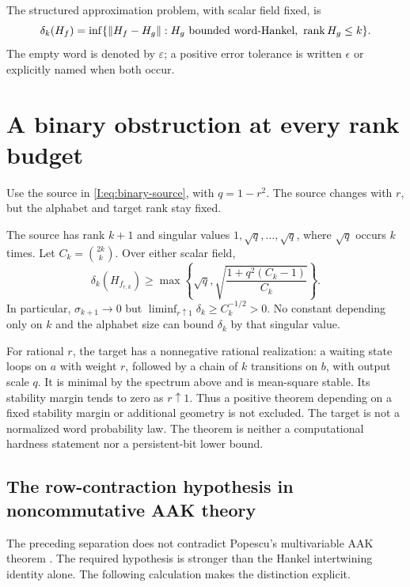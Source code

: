 The structured approximation problem, with scalar field fixed, is
\begin{equation}\label{I:U:eq:problem}
 \delta_k(H_f)=\inf\{\|H_f-H_g\|:H_g\text{ bounded word-Hankel},\ \operatorname{rank} H_g\le k\}.
\end{equation}
The empty word is denoted by $\varepsilon$; a positive error tolerance is
written $\epsilon$ or explicitly named when both occur.

\section{A binary obstruction at every rank budget}\label{I:U:sec:obstruction}
Use the source in \eqref{I:eq:binary-source}, with $q=1-r^2$.
The source changes with $r$, but the alphabet and target rank stay fixed.

\begin{theorem}\label{I:U:thm:separation}
The source has rank $k+1$ and singular values $1,\sqrt q,\ldots,\sqrt q$,
where $\sqrt q$ occurs $k$ times. Let $C_k=\binom{2k}{k}$. Over either
scalar field,
\[
 \delta_k(H_{f_{r,k}})\ge
 \max\left\{\sqrt q,\sqrt{\frac{1+q^2(C_k-1)}{C_k}}\right\}.
\]
In particular, $\sigma_{k+1}\to0$ but
$\liminf_{r\uparrow1}\delta_k\ge C_k^{-1/2}>0$. No constant depending
only on $k$ and the alphabet size can bound $\delta_k$ by that singular value.
\end{theorem}


\begin{remark}
For rational $r$, the target has a nonnegative rational realization: a waiting
state loops on $a$ with weight $r$, followed by a chain of $k$ transitions on
$b$, with output scale $q$. It is minimal by the spectrum above and is
mean-square stable. Its stability margin tends to zero as $r\uparrow1$.
Thus a positive theorem depending on a fixed stability margin or additional
geometry is not excluded. The target is not a normalized word probability
law. The theorem is neither a computational hardness statement nor a
persistent-bit lower bound.
\end{remark}
\subsection{The row-contraction hypothesis in noncommutative AAK theory}\label{I:U:sec:free-aak-obstruction}

The preceding separation does not contradict Popescu's multivariable
AAK theorem \cite{popescu2003}.  The required hypothesis is stronger than
the Hankel intertwining identity alone.  The following calculation makes
the distinction explicit.

